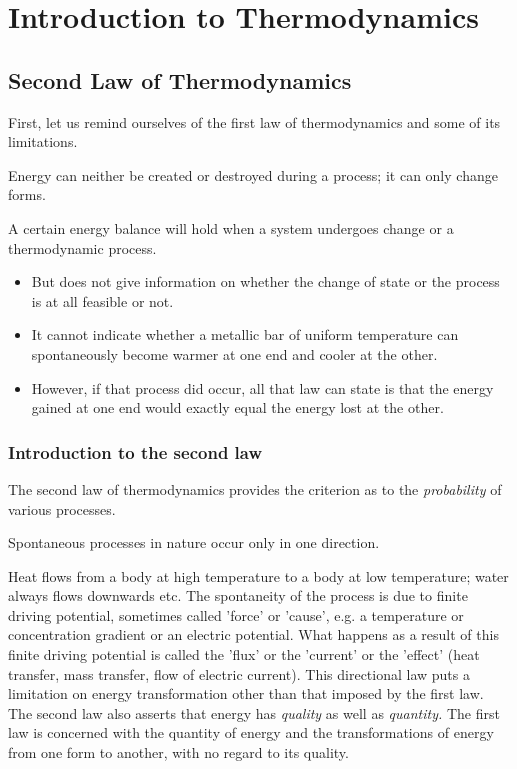 \chapter{Introduction to Thermodynamics}
\section{Second Law of Thermodynamics}
First, let us remind ourselves of the first law of thermodynamics and some of its limitations.
\begin{center}
  Energy can neither be created or destroyed during a process; it can only change forms.
\end{center}
A certain energy balance will hold when a system undergoes change or a thermodynamic process.
\begin{itemize}[noitemsep]
  \item But does not give information on whether the change of state or the process is at all feasible or not.
  \item It cannot indicate whether a metallic bar of uniform temperature can spontaneously become warmer at one end and cooler at the other.
  \item However, if that process did occur, all that law can state is that the energy gained at one end would exactly equal the energy lost at the other.
\end{itemize}
\subsection{Introduction to the second law}
The second law of thermodynamics provides the criterion as to the \emph{probability} of various processes.
\begin{center}
  Spontaneous processes in nature occur only in one direction.
\end{center}
Heat flows from a body at high temperature to a body at low temperature; water always flows downwards etc. The spontaneity of the process is due to finite driving potential, sometimes called 'force' or 'cause', e.g. a temperature or concentration gradient or an electric potential. What happens as a result of this finite driving potential is called the 'flux' or the 'current' or the 'effect' (heat transfer, mass transfer, flow of electric current). This directional law puts a limitation on energy transformation other than that imposed by the first law. The second law also asserts that energy has \emph{quality} as well as \emph{quantity.} The first law is concerned with the quantity of energy and the transformations of energy from one form to another, with no regard to its quality.

